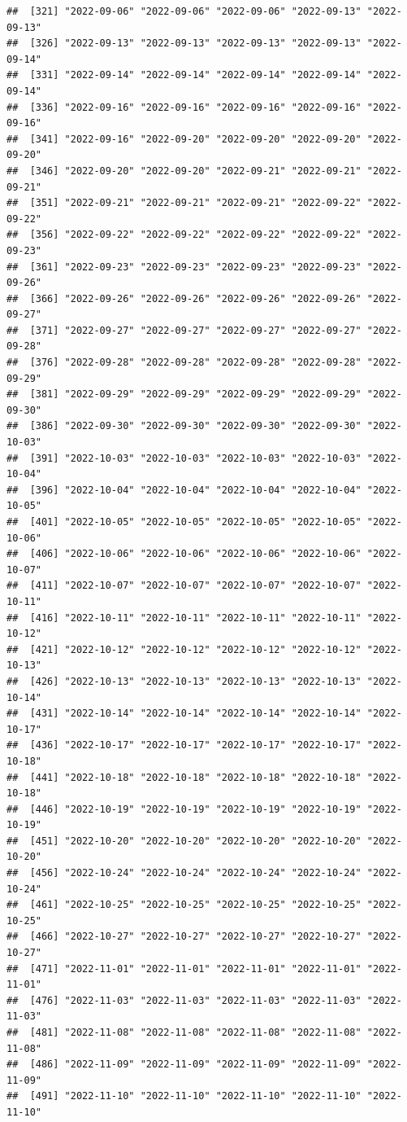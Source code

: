 \documentclass[
]{article}
\begin{document}
\begin{verbatim}
##  [321] "2022-09-06" "2022-09-06" "2022-09-06" "2022-09-13" "2022-09-13"
##  [326] "2022-09-13" "2022-09-13" "2022-09-13" "2022-09-13" "2022-09-14"
##  [331] "2022-09-14" "2022-09-14" "2022-09-14" "2022-09-14" "2022-09-14"
##  [336] "2022-09-16" "2022-09-16" "2022-09-16" "2022-09-16" "2022-09-16"
##  [341] "2022-09-16" "2022-09-20" "2022-09-20" "2022-09-20" "2022-09-20"
##  [346] "2022-09-20" "2022-09-20" "2022-09-21" "2022-09-21" "2022-09-21"
##  [351] "2022-09-21" "2022-09-21" "2022-09-21" "2022-09-22" "2022-09-22"
##  [356] "2022-09-22" "2022-09-22" "2022-09-22" "2022-09-22" "2022-09-23"
##  [361] "2022-09-23" "2022-09-23" "2022-09-23" "2022-09-23" "2022-09-26"
##  [366] "2022-09-26" "2022-09-26" "2022-09-26" "2022-09-26" "2022-09-27"
##  [371] "2022-09-27" "2022-09-27" "2022-09-27" "2022-09-27" "2022-09-28"
##  [376] "2022-09-28" "2022-09-28" "2022-09-28" "2022-09-28" "2022-09-29"
##  [381] "2022-09-29" "2022-09-29" "2022-09-29" "2022-09-29" "2022-09-30"
##  [386] "2022-09-30" "2022-09-30" "2022-09-30" "2022-09-30" "2022-10-03"
##  [391] "2022-10-03" "2022-10-03" "2022-10-03" "2022-10-03" "2022-10-04"
##  [396] "2022-10-04" "2022-10-04" "2022-10-04" "2022-10-04" "2022-10-05"
##  [401] "2022-10-05" "2022-10-05" "2022-10-05" "2022-10-05" "2022-10-06"
##  [406] "2022-10-06" "2022-10-06" "2022-10-06" "2022-10-06" "2022-10-07"
##  [411] "2022-10-07" "2022-10-07" "2022-10-07" "2022-10-07" "2022-10-11"
##  [416] "2022-10-11" "2022-10-11" "2022-10-11" "2022-10-11" "2022-10-12"
##  [421] "2022-10-12" "2022-10-12" "2022-10-12" "2022-10-12" "2022-10-13"
##  [426] "2022-10-13" "2022-10-13" "2022-10-13" "2022-10-13" "2022-10-14"
##  [431] "2022-10-14" "2022-10-14" "2022-10-14" "2022-10-14" "2022-10-17"
##  [436] "2022-10-17" "2022-10-17" "2022-10-17" "2022-10-17" "2022-10-18"
##  [441] "2022-10-18" "2022-10-18" "2022-10-18" "2022-10-18" "2022-10-18"
##  [446] "2022-10-19" "2022-10-19" "2022-10-19" "2022-10-19" "2022-10-19"
##  [451] "2022-10-20" "2022-10-20" "2022-10-20" "2022-10-20" "2022-10-20"
##  [456] "2022-10-24" "2022-10-24" "2022-10-24" "2022-10-24" "2022-10-24"
##  [461] "2022-10-25" "2022-10-25" "2022-10-25" "2022-10-25" "2022-10-25"
##  [466] "2022-10-27" "2022-10-27" "2022-10-27" "2022-10-27" "2022-10-27"
##  [471] "2022-11-01" "2022-11-01" "2022-11-01" "2022-11-01" "2022-11-01"
##  [476] "2022-11-03" "2022-11-03" "2022-11-03" "2022-11-03" "2022-11-03"
##  [481] "2022-11-08" "2022-11-08" "2022-11-08" "2022-11-08" "2022-11-08"
##  [486] "2022-11-09" "2022-11-09" "2022-11-09" "2022-11-09" "2022-11-09"
##  [491] "2022-11-10" "2022-11-10" "2022-11-10" "2022-11-10" "2022-11-10"

\end{verbatim}
\end{document}
